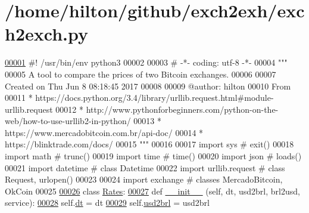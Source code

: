 \hypertarget{exch2exch_8py_source}{}\section{/home/hilton/github/exch2exh/exch2exch.py}

\begin{DoxyCode}
\hyperlink{namespaceexch2exch}{00001} \textcolor{comment}{#! /usr/bin/env python3 }
00002 
00003 \textcolor{comment}{# -*- coding: utf-8 -*-}
00004 \textcolor{stringliteral}{"""}
00005 \textcolor{stringliteral}{A tool to compare the prices of two Bitcoin exchanges. }
00006 \textcolor{stringliteral}{}
00007 \textcolor{stringliteral}{Created on Thu Jun  8 08:18:45 2017}
00008 \textcolor{stringliteral}{}
00009 \textcolor{stringliteral}{@author: hilton}
00010 \textcolor{stringliteral}{From }
00011 \textcolor{stringliteral}{* https://docs.python.org/3.4/library/urllib.request.html#module-urllib.request}
00012 \textcolor{stringliteral}{* http://www.pythonforbeginners.com/python-on-the-web/how-to-use-urllib2-in-python/}
00013 \textcolor{stringliteral}{* https://www.mercadobitcoin.com.br/api-doc/}
00014 \textcolor{stringliteral}{* https://blinktrade.com/docs/}
00015 \textcolor{stringliteral}{"""}
00016 
00017 \textcolor{keyword}{import} sys            \textcolor{comment}{# exit()}
00018 \textcolor{keyword}{import} math           \textcolor{comment}{# trunc()  }
00019 \textcolor{keyword}{import} time           \textcolor{comment}{# time()  }
00020 \textcolor{keyword}{import} json           \textcolor{comment}{# loads()  }
00021 \textcolor{keyword}{import} datetime       \textcolor{comment}{# class Datetime  }
00022 \textcolor{keyword}{import} urllib.request \textcolor{comment}{# class Request, urlopen()}
00023 
00024 \textcolor{keyword}{import} exchange       \textcolor{comment}{# classes MercadoBitcoin, OkCoin}
00025 
\hyperlink{classexch2exch_1_1_rates}{00026} \textcolor{keyword}{class }\hyperlink{classexch2exch_1_1_rates}{Rates}:
\hyperlink{classexch2exch_1_1_rates_a2868d5631b08e767680f1d0cd0a6420a}{00027}     \textcolor{keyword}{def }\hyperlink{classexch2exch_1_1_rates_a2868d5631b08e767680f1d0cd0a6420a}{\_\_init\_\_} (self, dt, usd2brl, brl2usd, service):
\hyperlink{classexch2exch_1_1_rates_acb12f83bce4393714ec30351a1d636c2}{00028}         self.\hyperlink{classexch2exch_1_1_rates_acb12f83bce4393714ec30351a1d636c2}{dt}  = dt
\hyperlink{classexch2exch_1_1_rates_ab79ad6e4a42ca358e6b39c825a4b8a0b}{00029}         self.\hyperlink{classexch2exch_1_1_rates_ab79ad6e4a42ca358e6b39c825a4b8a0b}{usd2brl} = usd2brl

\end{DoxyCode}
